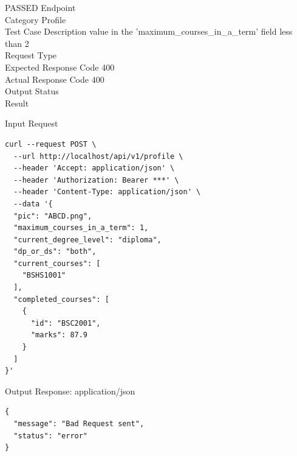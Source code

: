 \begin{testcase}{11}{PASSED}
Endpoint \hfill {}\\
Category \hfill Profile\\
Test Case Description \hfill value in the 'maximum\_courses\_in\_a\_term' field less than 2\\

Request Type    \hfill {}\\
Expected Response Code    \hfill 400\\
Actual Response Code    \hfill 400\\

Output Status \hfill {}\\
Result \hfill {}

\begin{ipblock}{Input Request}
\begin{verbatim}
curl --request POST \
  --url http://localhost/api/v1/profile \
  --header 'Accept: application/json' \
  --header 'Authorization: Bearer ***' \
  --header 'Content-Type: application/json' \
  --data '{
  "pic": "ABCD.png",
  "maximum_courses_in_a_term": 1,
  "current_degree_level": "diploma",
  "dp_or_ds": "both",
  "current_courses": [
    "BSHS1001"
  ],
  "completed_courses": [
    {
      "id": "BSC2001",
      "marks": 87.9
    }
  ]
}'
\end{verbatim}
\end{ipblock}

\begin{opblock}{Output Response: application/json}
\begin{verbatim}
{
  "message": "Bad Request sent",
  "status": "error"
}
\end{verbatim}
\end{opblock}
\end{testcase}


